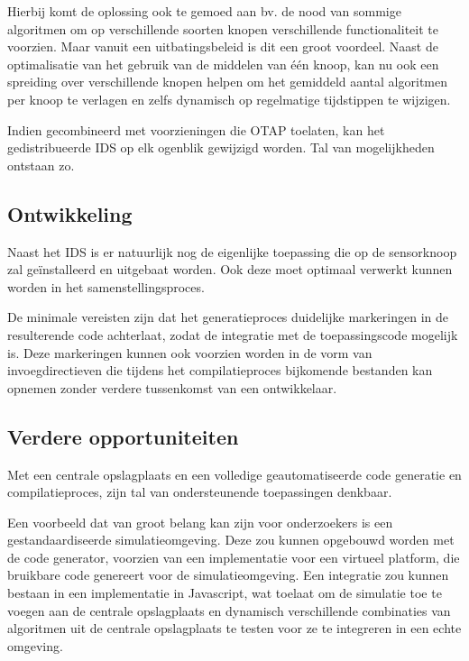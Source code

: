 Hierbij komt de oplossing ook te gemoed aan bv. de nood van sommige algoritmen
om op verschillende soorten knopen verschillende functionaliteit te voorzien.
Maar vanuit een uitbatingsbeleid is dit een groot voordeel. Naast de
optimalisatie van het gebruik van de middelen van \'e\'en knoop, kan nu ook een
spreiding over verschillende knopen helpen om het gemiddeld aantal algoritmen
per knoop te verlagen en zelfs dynamisch op regelmatige tijdstippen te wijzigen.

Indien gecombineerd met voorzieningen die OTAP toelaten, kan het
gedistribueerde IDS op elk ogenblik gewijzigd worden. Tal van mogelijkheden
ontstaan zo.

\subsection{Ontwikkeling}
\label{subsection:arch-integration}

Naast het IDS is er natuurlijk nog de eigenlijke toepassing die op de
sensorknoop zal ge\"installeerd en uitgebaat worden. Ook deze moet optimaal
verwerkt kunnen worden in het samenstellingsproces.

De minimale vereisten zijn dat het generatieproces duidelijke markeringen in de
resulterende code achterlaat, zodat de integratie met de toepassingscode
mogelijk is. Deze markeringen kunnen ook voorzien worden in de vorm van
invoegdirectieven die tijdens het compilatieproces bijkomende bestanden kan
opnemen zonder verdere tussenkomst van een ontwikkelaar.

\subsection{Verdere opportuniteiten}
\label{subsection:arch-opportunities}

Met een centrale opslagplaats en een volledige geautomatiseerde code generatie
en compilatieproces, zijn tal van ondersteunende toepassingen denkbaar.

Een voorbeeld dat van groot belang kan zijn voor onderzoekers is een
gestandaardiseerde simulatieomgeving. Deze zou kunnen opgebouwd worden met de
code generator, voorzien van een implementatie voor een virtueel platform, die
bruikbare code genereert voor de simulatieomgeving. Een integratie zou kunnen
bestaan in een implementatie in Javascript, wat toelaat om de simulatie toe te
voegen aan de centrale opslagplaats en dynamisch verschillende combinaties van
algoritmen uit de centrale opslagplaats te testen voor ze te integreren in een
echte omgeving.

